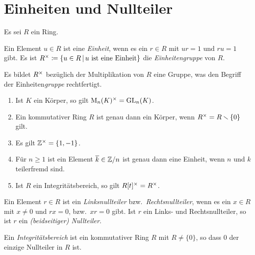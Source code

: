 \section{Einheiten und Nullteiler}

Es sei $R$ ein Ring.

\begin{definition}
  Ein Element $u \in R$ ist eine \emph{Einheit}, wenn es ein $r \in R$ mit $ur = 1$ und $ru = 1$ gibt.
  Es ist
  $
              \unitgroup{R}
    \defined  \{
                u \in R
              \suchthat 
                \text{$u$ ist eine Einheit}
              \}
  $
  die \emph{Einheitengruppe} von $R$.
\end{definition}

Es bildet $R^{\times}$ bezüglich der Multiplikation von $R$ eine Gruppe, was den Begriff der Einheiten\emph{gruppe} rechtfertigt.

\begin{example}
  \begin{enumerate}
    \item
      Ist $K$ ein Körper, so gilt $\operatorname{M}_{n}(K)^{\times} = \operatorname{GL}_{n}(K)$.
    \item
      Ein kommutativer Ring $R$ ist genau dann ein Körper, wenn $R^{\times} = R \smallsetminus \{0\}$ gilt.
    \item
      Es gilt $\mathbb{Z}^{\times} = \{1, -1\}$.
    \item
      Für $n \geq 1$ ist ein Element $\overline{k} \in \mathbb{Z}/n$ ist genau dann eine Einheit, wenn $n$ und $k$ teilerfremd sind.
    \item
      Ist $R$ ein Integritätsbereich, so gilt $R[t]^{\times} = R^{\times}$.
  \end{enumerate}
\end{example}

\begin{definition}
  Ein Element $r \in R$ ist ein \emph{Linksnullteiler} bzw.\ \emph{Rechtsnullteiler}, wenn es ein $x \in R$ mit $x \neq 0$ und $rx = 0$, bzw.\ $xr = 0$ gibt.
  Ist $r$ ein Links- und Rechtsnullteiler, so ist $r$ ein \emph{\textup(beidseitiger\textup) Nullteiler}.
\end{definition}

\begin{definition}
  Ein \emph{Integritätsbereich} ist ein kommutativer Ring $R$ mit $R \neq \{0\}$, so dass $0$ der einzige Nullteiler in $R$ ist.
\end{definition}






